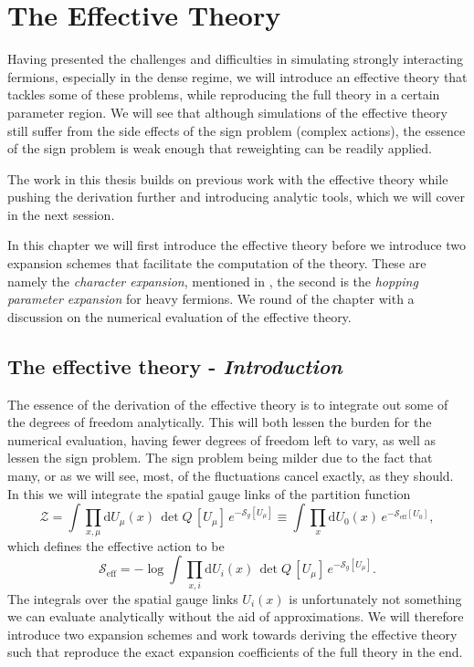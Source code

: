 \chapter{The Effective Theory}

Having presented the challenges and difficulties in simulating strongly
interacting fermions, especially in the dense regime, we will introduce an
effective theory that tackles some of these problems, while reproducing the full
theory in a certain parameter region. We will see that although simulations of
the effective theory still suffer from the side effects of the sign problem
(complex actions), the essence of the sign problem is weak enough that
reweighting can be readily applied.

The work in this thesis builds on previous work with the effective theory while
pushing the derivation further and introducing analytic tools, which we will
cover in the next session.

In this chapter we will first introduce the effective theory before we introduce
two expansion schemes that facilitate the computation of the theory. These are
namely the \emph{character expansion}, mentioned in ,
the second is the \emph{hopping parameter expansion} for heavy fermions. We
round of the chapter with a discussion on the numerical evaluation of the
effective theory.

\section{The effective theory - \texorpdfstring{\itshape Introduction}{Introduction}}

The essence of the derivation of the effective theory is to integrate out some
of the degrees of freedom analytically. This will both lessen the burden for the
numerical evaluation, having fewer degrees of freedom left to vary, as well as
lessen the sign problem. The sign problem being milder due to the fact that
many, or as we will see, most, of the fluctuations cancel exactly, as they
should. In this we will integrate the spatial gauge links of the partition
function
%
\begin{equation}
  \mathcal{Z} = \int \prod_{x, \mu} \mathrm{d} U_{\mu}(x) \, \det Q \, [U_{\mu}] \,
    e^{-\mathcal{S}_g[U_{\mu}]}
    \equiv \int \prod_{x} \mathrm{d} U_0(x) \,
    e^{-\mathcal{S}_{\text{eff}}[U_0]},
\end{equation}
%
which defines the effective action to be
%
\begin{equation}
  \mathcal{S}_{\text{eff}} = - \log \int \prod_{x, i} \mathrm{d} U_i(x) \, \det
    Q \, [U_{\mu}] \, e^{-\mathcal{S}_g [U_{\mu}]}.
\end{equation}
%
The integrals over the spatial gauge links $U_i(x)$ is unfortunately not
something we can evaluate analytically without the aid of approximations. We
will therefore introduce two expansion schemes and work towards deriving the
effective theory such that reproduce the exact expansion coefficients of the
full theory in the end.


